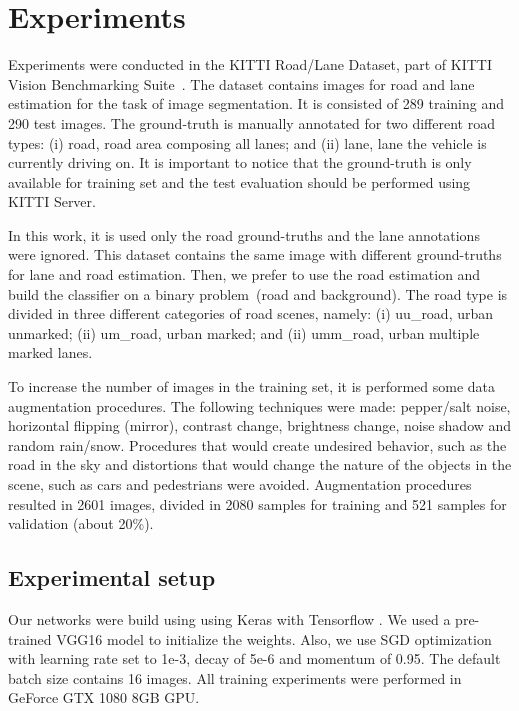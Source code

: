 \section{Experiments}
\label{sec:experiments}

Experiments were conducted in the KITTI Road/Lane Dataset, part of KITTI Vision Benchmarking Suite~\cite{KITTI}. The dataset  contains  images for road and lane estimation for the task of image segmentation. It is consisted of 289 training and 290 test images. The ground-truth is manually annotated for two different road types: (i) road, road area composing all lanes; and (ii) lane, lane the vehicle is currently driving on. It is important to notice that the ground-truth is only available for training set and the test evaluation should be performed using KITTI Server.

In this work, it is used only the road ground-truths and the lane annotations were ignored. This dataset contains the same image with different ground-truths for lane and road estimation. Then, we prefer to use the road estimation and build the classifier on a binary problem~(road and background). The road type is divided in three different categories of road scenes, namely: (i) uu\_road, urban unmarked; (ii) um\_road, urban marked; and (ii) umm\_road, urban multiple marked lanes.  

To increase the number of images in the training set, it is performed some data augmentation procedures. The following techniques were made: pepper/salt noise, horizontal flipping (mirror), contrast change, brightness change, noise shadow and random rain/snow. Procedures that would create undesired behavior, such as the road in the sky and distortions that would change the nature of the objects in the scene, such as cars and pedestrians were avoided. Augmentation procedures resulted in 2601 images, divided in 2080 samples for training and 521 samples for validation (about 20\%). 


\subsection{Experimental setup}
   
Our networks were build using using Keras \cite{chollet2015keras} with Tensorflow \cite{tensorflow2015-whitepaper}. We used a pre-trained VGG16 model to initialize the weights. Also, we use SGD optimization with learning rate set to 1e-3, decay of 5e-6 and momentum of 0.95. The default batch size contains 16 images. All training experiments were performed in GeForce GTX 1080 8GB GPU.

